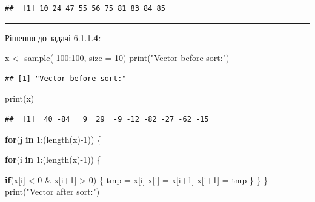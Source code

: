 \documentclass[
]{book}
\newenvironment{Shaded}{\begin{snugshade}}{\end{snugshade}}
\newcommand{\AttributeTok}[1]{\textcolor[rgb]{0.77,0.63,0.00}{#1}}
\newcommand{\ControlFlowTok}[1]{\textcolor[rgb]{0.13,0.29,0.53}{\textbf{#1}}}
\newcommand{\DecValTok}[1]{\textcolor[rgb]{0.00,0.00,0.81}{#1}}
\newcommand{\FunctionTok}[1]{\textcolor[rgb]{0.00,0.00,0.00}{#1}}
\newcommand{\NormalTok}[1]{#1}
\newcommand{\OtherTok}[1]{\textcolor[rgb]{0.56,0.35,0.01}{#1}}
\newcommand{\SpecialCharTok}[1]{\textcolor[rgb]{0.00,0.00,0.00}{#1}}
\newcommand{\StringTok}[1]{\textcolor[rgb]{0.31,0.60,0.02}{#1}}
\begin{document}
\begin{verbatim}
##  [1] 10 24 47 55 56 75 81 83 84 85
\end{verbatim}

\begin{center}\rule{0.5\linewidth}{0.5pt}\end{center}

Рішення до \protect\hyperlink{task6114}{задачі 6.1.1.\textbf{4}}:

\begin{Shaded}
\begin{Highlighting}[]
\NormalTok{x }\OtherTok{\textless{}{-}} \FunctionTok{sample}\NormalTok{(}\SpecialCharTok{{-}}\DecValTok{100}\SpecialCharTok{:}\DecValTok{100}\NormalTok{, }\AttributeTok{size =} \DecValTok{10}\NormalTok{)}
\FunctionTok{print}\NormalTok{(}\StringTok{"Vector before sort:"}\NormalTok{)}
\end{Highlighting}
\end{Shaded}

\begin{verbatim}
## [1] "Vector before sort:"
\end{verbatim}

\begin{Shaded}
\begin{Highlighting}[]
\FunctionTok{print}\NormalTok{(x)}
\end{Highlighting}
\end{Shaded}

\begin{verbatim}
##  [1]  40 -84   9  29  -9 -12 -82 -27 -62 -15
\end{verbatim}

\begin{Shaded}
\begin{Highlighting}[]
\ControlFlowTok{for}\NormalTok{(j }\ControlFlowTok{in} \DecValTok{1}\SpecialCharTok{:}\NormalTok{(}\FunctionTok{length}\NormalTok{(x)}\SpecialCharTok{{-}}\DecValTok{1}\NormalTok{)) \{}
  
  \ControlFlowTok{for}\NormalTok{(i }\ControlFlowTok{in} \DecValTok{1}\SpecialCharTok{:}\NormalTok{(}\FunctionTok{length}\NormalTok{(x)}\SpecialCharTok{{-}}\DecValTok{1}\NormalTok{)) \{}
    
    \ControlFlowTok{if}\NormalTok{(x[i] }\SpecialCharTok{\textless{}} \DecValTok{0} \SpecialCharTok{\&}\NormalTok{ x[i}\SpecialCharTok{+}\DecValTok{1}\NormalTok{] }\SpecialCharTok{\textgreater{}} \DecValTok{0}\NormalTok{) \{}
\NormalTok{      tmp }\OtherTok{=}\NormalTok{ x[i]}
\NormalTok{      x[i] }\OtherTok{=}\NormalTok{ x[i}\SpecialCharTok{+}\DecValTok{1}\NormalTok{]}
\NormalTok{      x[i}\SpecialCharTok{+}\DecValTok{1}\NormalTok{] }\OtherTok{=}\NormalTok{ tmp}
\NormalTok{    \}}
\NormalTok{  \}}
\NormalTok{\}}
\FunctionTok{print}\NormalTok{(}\StringTok{"Vector after sort:"}\NormalTok{)}
\end{Highlighting}
\end{Shaded}
\end{document}
